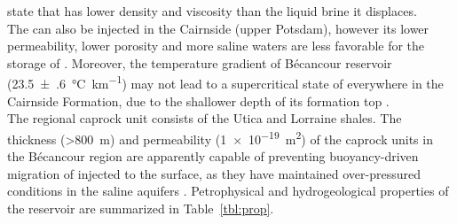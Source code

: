 state that has lower density and viscosity than the liquid brine it displaces.\\
The  can also be injected in the Cairnside (upper Potsdam), however its
lower permeability, lower porosity and more saline waters are less favorable for
the storage of  \citep{TranNgoc2014}. Moreover, the temperature gradient
of Bé\-can\-cour reservoir (\SI[multi-part-units =
single]{23.5(6)}{\degreeCelsius\per\km}) may not lead to a supercritical state
of  everywhere in the Cairnside Formation, due to the shallower depth of
its formation top \citep{Claprood2012}.\\
The regional caprock unit consists of the Utica and Lorraine shales. The
thickness (\SI{>800}{\metre}) and permeability (\SI{1e-19}{\metre\squared}) of
the caprock units in the Bé\-can\-cour region are apparently capable of
preventing buoyancy-driven migration of injected  to the surface, as
they have maintained over-pressured conditions in the saline aquifers
\citep{TranNgoc2014}. Petrophysical and hydrogeological properties of the
reservoir are summarized in Table~\cref{tbl:prop}.
